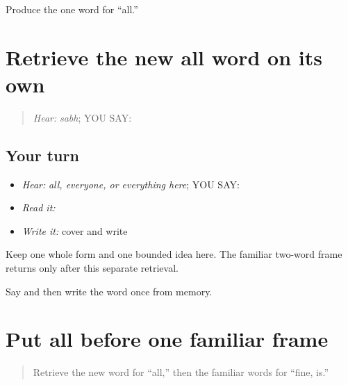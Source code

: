 \begin{tcolorbox}[breakable,colback=teal!4,colframe=teal!35!black,title={Before you move on}]
Produce the one word for “all.”
\end{tcolorbox}
\section[\texorpdfstring{\pa{ਸਭ} (sabh)}{ਸਭ (sabh)}]{Retrieve the new all word on its own}

\label{lesson:PA-C205-sabh-review}



\begin{quote}
\emph{Hear:} \emph{sabh}; YOU SAY: \textbf{}
\end{quote}

\subsection*{Your turn}
\begin{itemize}
\raggedright
  \item \emph{Hear:} \emph{all, everyone, or everything here}; YOU SAY: \textbf{}
  \item \emph{Read it:} \textbf{}
  \item \emph{Write it:} cover and write \textbf{}
\end{itemize}

\begin{grammarlens}[title={Grammar Lens}]
Keep one whole form and one bounded idea here. The familiar two-word frame returns only after this separate retrieval.
\end{grammarlens}

\begin{tcolorbox}[breakable,colback=teal!4,colframe=teal!35!black,title={Before you move on}]
Say and then write the word once from memory.
\end{tcolorbox}
\section[\texorpdfstring{\pa{ਸਭ} \pa{ਠੀਕ} \pa{ਹੈ} (sabh thik hai)}{ਸਭ ਠੀਕ ਹੈ (sabh thik hai)}]{Put all before one familiar frame}

\label{lesson:PA-C205-everything-fine}



\begin{quote}
Retrieve the new word for “all,” then the familiar words for “fine, is.”
\end{quote}

